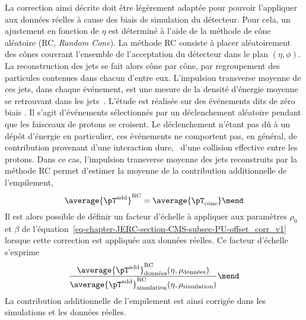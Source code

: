 \par La correction ainsi décrite doit être légèrement adaptée pour pouvoir l'appliquer aux données réelles à cause des biais de simulation du détecteur.
Pour cela, un ajustement en fonction de $\eta$ est déterminé à l'aide de la méthode de cône aléatoire (RC, \emph{Random Cone}).
La méthode RC consiste à placer aléatoirement des cônes couvrant l'ensemble de l'acceptation du détecteur dans le plan $(\eta, \phi)$.
La reconstruction des jets se fait alors cône par cône, par regroupement des particules contenues dans chacun d'entre eux.
L'impulsion transverse moyenne de ces jets, dans chaque événement, est une mesure de la densité d'énergie moyenne se retrouvant dans les jets~\cite{JERC_RunI}.
L'étude est réalisée sur des événements dits de \og zéro biais \fg.
Il s'agit d'événements sélectionnés par un déclenchement aléatoire pendant que les faisceaux de protons se croisent.
Le déclenchement n'étant pas dû à un dépôt d'énergie en particulier, ces événements ne comportent pas, en général, de contribution provenant d'une interaction dure, \ie\ d'une collision effective entre les protons.
Dans ce cas, l'impulsion transverse moyenne des jets reconstruits par la méthode RC permet d'estimer la moyenne de la contribution additionnelle de l'empilement, \ie
\begin{equation}
\average{\pT^\text{add}}^\text{RC} = \average{\pT_\text{cône}}
\mend
\end{equation}
Il est alors possible de définir un facteur d'échelle à appliquer aux paramètres $\rho_0$ et $\beta$ de l'équation~\eqref{eq-chapter-JERC-section-CMS-subsec-PU-offset_corr_v1} lorsque cette correction est appliquée aux données réelles. Ce facteur d'échelle s'exprime
\begin{equation}
\frac{\average{\pT^\text{add}}^\text{RC}_\text{données}(\eta, \rho_\text{données})}{\average{\pT^\text{add}}^\text{RC}_\text{simulation}(\eta, \rho_\text{simulation})}
\mend
\end{equation}
La contribution additionnelle de l'empilement est ainsi corrigée dans les simulations et les données réelles.
